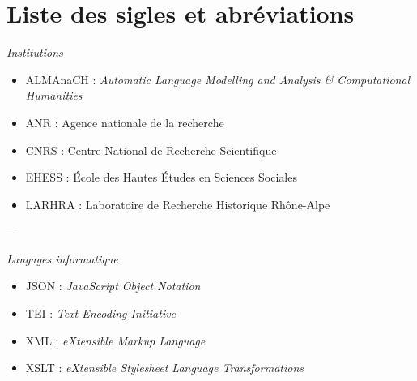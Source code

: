 \chapter*{Liste des sigles et abréviations}

\begin{center}
\textit{Institutions}
\end{center} 

\begin{itemize}
    \item ALMAnaCH : \emph{Automatic Language Modelling and Analysis \& Computational Humanities}
    \item ANR : Agence nationale de la recherche
    \item CNRS : Centre National de Recherche Scientifique
    \item EHESS : École des Hautes Études en Sciences Sociales
    \item LARHRA : Laboratoire de Recherche Historique Rhône-Alpe
\end{itemize}

\bigbreak

\bigbreak

\begin{center}---

\bigbreak

\textit{Langages informatique}
\end{center} 

\bigbreak

\begin{itemize}
    \item JSON : \emph{JavaScript Object Notation}
    \item TEI : \emph{Text Encoding Initiative}
    \item XML : \emph{eXtensible Markup Language}
    \item XSLT : \emph{eXtensible Stylesheet Language Transformations}
\end{itemize}

\clearpage
\thispagestyle{empty}